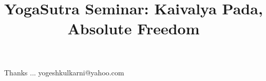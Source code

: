 \documentclass[xcolor=dvipsnames,compress,t,pdf,9pt]{beamer}
\title[\insertframenumber /\inserttotalframenumber]{YogaSutra Seminar: Kaivalya Pada, Absolute Freedom}
\begin{document}
	\begin{frame}
	\titlepage
	\end{frame}

	

	\begin{frame}[c]{}
	Thanks ...
	\vspace{5mm}
	yogeshkulkarni@yahoo.com
	\end{frame}
\end{document}
